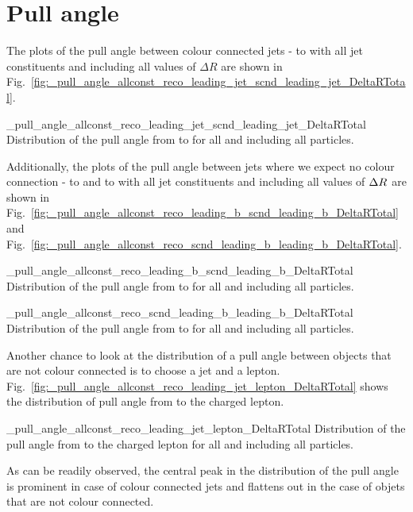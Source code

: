 \section{Pull angle}

The plots of the pull angle between colour connected jets - \leadingjet to \scndleadingjet with all jet constituents and including all values of $\Delta R$ are shown in Fig.~\ref{fig:_pull_angle_allconst_reco_leading_jet_scnd_leading_jet_DeltaRTotal}.

          {_pull_angle_allconst_reco_leading_jet_scnd_leading_jet_DeltaRTotal}
          {Distribution of the pull angle from \leadingjet to \scndleadingjet for all \DeltaR and including all particles.}


Additionally, the plots of the pull angle between jets where we expect no colour connection - \leadingb to \scndleadingb and \scndleadingb to \leadingb with all jet constituents and including all values of $\Delta R^{} $ are shown in Fig.~\ref{fig:_pull_angle_allconst_reco_leading_b_scnd_leading_b_DeltaRTotal} and Fig.~\ref{fig:_pull_angle_allconst_reco_scnd_leading_b_leading_b_DeltaRTotal}.

          {_pull_angle_allconst_reco_leading_b_scnd_leading_b_DeltaRTotal}
          {Distribution of the pull angle from \leadingb to \scndleadingb for all \DeltaR and including all particles.}

          {_pull_angle_allconst_reco_scnd_leading_b_leading_b_DeltaRTotal}
          {Distribution of the pull angle from \scndleadingb to \leadingb for all \DeltaR and including all particles.}


Another chance to look at the distribution of a pull angle between objects that are not colour connected is to choose a jet and a lepton. Fig.~\ref{fig:_pull_angle_allconst_reco_leading_jet_lepton_DeltaRTotal} shows the distribution of pull angle from \leadingjet to the charged lepton. 

          {_pull_angle_allconst_reco_leading_jet_lepton_DeltaRTotal}
          {Distribution of the pull angle from \leadingjet to the charged lepton for all \DeltaR and including all particles.}

As can be readily observed, the central peak in the distribution of the pull angle is prominent in case of colour connected jets and flattens out in the case of objets that are not colour connected.

